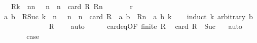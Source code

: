 \begin{isabellebody}
\ \ \ {\isachardoublequoteopen}R{\isacharcircum}{\kern0pt}{\isacharcircum}{\kern0pt}k\ {\isasymsubseteq}\ {\isacharparenleft}{\kern0pt}{\isasymUnion}n{\isasymin}{\isacharbraceleft}{\kern0pt}n{\isachardot}{\kern0pt}\ {}\ {\isacharless}{\kern0pt}\ n\ {\isasymand}\ n\ {\isasymle}\ card\ R{\isacharbraceright}{\kern0pt}{\isachardot}{\kern0pt}\ R{\isacharcircum}{\kern0pt}{\isacharcircum}{\kern0pt}n{\isacharparenright}{\kern0pt}{\isachardoublequoteclose}\isanewline
\ \ \ \ {\isacharparenleft}{\kern0pt}\ {\isachardoublequoteopen}{\isacharunderscore}{\kern0pt}\ {\isasymsubseteq}\ {\isacharquery}{\kern0pt}r{\isachardoublequoteclose}{\isacharparenright}{\kern0pt}\isanewline
%
\isadelimproof
%
\endisadelimproof
%
\isatagproof
{}\isamarkupfalse%
\ {\isacharminus}{\kern0pt}\isanewline
\ \ \isamarkupfalse%
\ {\isachardoublequoteopen}{\isacharparenleft}{\kern0pt}a{\isacharcomma}{\kern0pt}\ b{\isacharparenright}{\kern0pt}\ {\isasymin}\ R{\isacharcircum}{\kern0pt}{\isacharcircum}{\kern0pt}{\isacharparenleft}{\kern0pt}Suc\ k{\isacharparenright}{\kern0pt}\ {\isasymLongrightarrow}\ {\isasymexists}n{\isachardot}{\kern0pt}\ {}\ {\isacharless}{\kern0pt}\ n\ {\isasymand}\ n\ {\isasymle}\ card\ R\ {\isasymand}\ {\isacharparenleft}{\kern0pt}a{\isacharcomma}{\kern0pt}\ b{\isacharparenright}{\kern0pt}\ {\isasymin}\ R{\isacharcircum}{\kern0pt}{\isacharcircum}{\kern0pt}n{\isachardoublequoteclose}\ \ a\ b\ k\isanewline
\ \ \isamarkupfalse%
\ {\isacharparenleft}{\kern0pt}induct\ k\ arbitrary{\isacharcolon}{\kern0pt}\ b{\isacharparenright}{\kern0pt}\isanewline
\ \ \ \ \isamarkupfalse%
\ {}\isanewline
\ \ \ \ \isamarkupfalse%
\ \isamarkupfalse%
\ {\isachardoublequoteopen}R\ {\isasymnoteq}\ {\isacharbraceleft}{\kern0pt}{\isacharbraceright}{\kern0pt}{\isachardoublequoteclose}\ \isamarkupfalse%
\ auto\isanewline
\ \ \ \ \isamarkupfalse%
\ card{\isacharunderscore}{\kern0pt}{}{\isacharunderscore}{\kern0pt}eq{\isacharbrackleft}{\kern0pt}OF\ {\isacartoucheopen}finite\ R{\isacartoucheclose}{\isacharbrackright}{\kern0pt}\ \isamarkupfalse%
\ {\isachardoublequoteopen}card\ R\ {\isasymge}\ Suc\ {}{\isachardoublequoteclose}\ \isamarkupfalse%
\ auto\isanewline
\ \ \ \ \isamarkupfalse%
\ \isamarkupfalse%
\ {\isacharquery}{\kern0pt}case\ \isamarkupfalse%
\ {}\ \isamarkupfalse%

\end{isabellebody}
